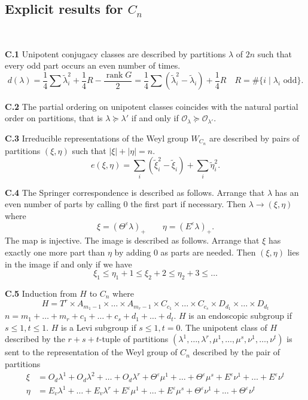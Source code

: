 \documentclass{amsart}
\newcommand\Amone[1]{A_{m_{#1}-1}}
\newcommand\eps	{\varepsilon}
\newcommand\lam	{\lambda}
\newcommand\lamtil	{\tilde\lambda}
\newcommand\cO		{{\mathcal O}}
\newcommand\rank	{\operatorname{rank}}
\newcommand\sumlam[1]{\sum_{#1} (\tilde\lam_i^2 - \tilde\lambda_i)}
\newcommand\sumxi	{\sum_i (\tilde\xi_i^2 - \tilde\xi_i)}
\begin{document}
\bigskip
\subsection{Explicit results for $C_n$}~\newline

\noindent
{\bf C.1} \qquad Unipotent conjugacy classes are described by partitions 
$\lam$ of $2n$ such that every odd part occurs an even number of times.
	$$
	d(\lam) = \frac 14 \sum \lamtil_i^2 +
	\frac 14 R - \frac {\rank G}2 = \frac 14 \sumlam{} +
	\frac 14 R \quad R = \# \{ i \mid \lam_i \text{ odd} \}.
	$$

\noindent
{\bf C.2} \qquad The partial ordering on unipotent classes coincides with the 
natural partial order on partitions, that is $\lam \succeq \lam'$ if and 
only if $\cO_\lam \succeq \cO_{\lam'}$.

\noindent
{\bf C.3} \qquad Irreducible representations of the Weyl group $W_{C_n}$ are 
described by pairs of partitions $(\xi,\eta)$ such that $|\xi| + |\eta| = n$.
	$$
	e(\xi,\eta) = \sumxi + \sum_i \tilde\eta_i^2.
	$$

\noindent
{\bf C.4} \qquad The Springer correspondence is described as follows.  
Arrange that $\lam$ has an even number of parts by calling 0 the first part 
if necessary.  Then $\lam \to (\xi,\eta)$ where
	$$
	\xi = (\Theta^\eps\lam)_+ \qquad \eta = (E^\eps\lam)_+.
	$$
The map is injective.  The image is described as follows.  Arrange that $\xi$
has exactly one more part than $\eta$ by adding 0 as parts are needed.  Then
$(\xi,\eta)$  lies in the image if and only if we have
	$$
	\xi_1 \le \eta_1+1 \le \xi_2+2 \le \eta_2+3 \le \dots
	$$

\noindent
{\bf C.5} \qquad Induction from $H$ to $C_n$ where 
	$$
	H = T^r \times \Amone{1} \times\dots\times \Amone{r} \times
	C_{c_1} \times\dots\times C_{c_s} \times D_{d_1} \times\dots\times
	D_{d_t}
	$$
$n= m_1 +\dots+ m_r+c_1 +\dots+ c_s+d_1 +\dots+ d_t$.
$H$ is an endoscopic subgroup if $s \le 1, t\le 1$.  $H$ is a Levi subgroup
if $s \le 1, t=0$.  The unipotent class of $H$ described by the 
$r+s+t$-tuple of partitions 
$(\lam^1 ,\dots, \lam^r,\mu^1 ,\dots, \mu^s, \nu^1 ,\dots, \nu^t)$ is sent
to the representation of the Weyl group of $C_n$ described by the pair of
partitions
	\begin{align*}
	\xi &= O_d\lam^1 + O_d\lam^2 +\dots+ O_d\lam^r +
		\Theta^\eps \mu^1 +\dots+ \Theta^\eps \mu^s + E^\eps\nu^1 
		+\dots+ E^\eps\nu^t \\
	\eta &= E_v \lam^1 +\dots+ E_v \lam^r +
		E^\eps \mu^1 +\dots+ E^\eps \mu^s + \Theta^\eps\nu^1
		+\dots+ \Theta^\eps\nu^t
	\end{align*}
\end{document}
